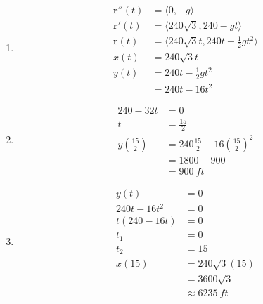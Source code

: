 \documentclass{article}
\begin{document}
\setcounter{subsubsection}{10}
\subsubsection{}

\begin{enumerate}
  \item

        \begin{align*}
          \mathbf{r}''(t) & = \langle 0, -g \rangle                                     \\
          \mathbf{r}'(t)  & = \langle 240 \sqrt{3}, 240 - g t \rangle                   \\
          \mathbf{r}(t)   & = \langle 240 \sqrt{3} t, 240 t - \frac{1}{2} g t^2 \rangle \\
          x(t)            & = 240 \sqrt{3} t                                            \\
          y(t)            & = 240 t - \frac{1}{2} g t^2                                 \\
                          & = 240 t - 16 t^2
        \end{align*}

  \item

        \begin{align*}
          240 - 32 t                    & = 0                                                   \\
          t                             & = \frac{15}{2}                                        \\
          y \left( \frac{15}{2} \right) & = 240 \frac{15}{2} - 16 \left( \frac{15}{2} \right)^2 \\
                                        & = 1800 - 900                                          \\
                                        & = \qty{900}{ft}
        \end{align*}

  \item

        \begin{align*}
          y(t)           & = 0                    \\
          240 t - 16 t^2 & = 0                    \\
          t (240 - 16 t) & = 0                    \\
          t_1            & = 0                    \\
          t_2            & = 15                   \\
          x(15)          & = 240 \sqrt{3} (15)    \\
                         & = 3600 \sqrt{3}        \\
                         & \approx \qty{6235}{ft}
        \end{align*}


\end{enumerate}
\end{document}
